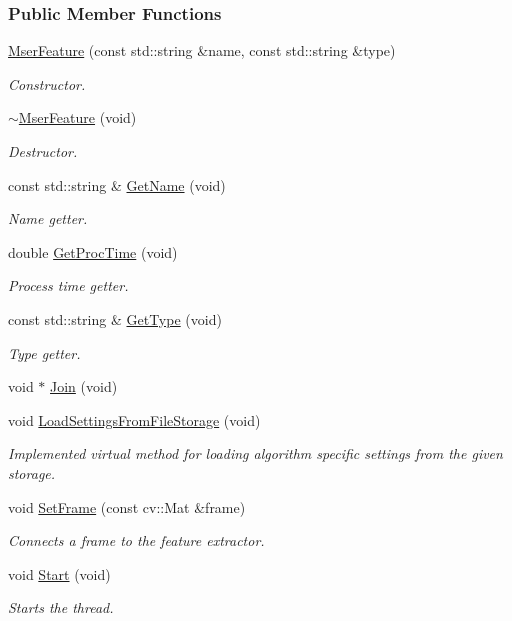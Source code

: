 \subsubsection*{Public Member Functions}
\begin{DoxyCompactItemize}
\item 
\hyperlink{group___feature_extractor_ae82ba666f45d0f4d88be995ae5b6209c}{Mser\-Feature} (const std\-::string \&name, const std\-::string \&type)
\begin{DoxyCompactList}\small\item\em Constructor. \end{DoxyCompactList}\item 
\hyperlink{group___feature_extractor_a4cf98957c8813b3ec26641ded124340d}{$\sim$\-Mser\-Feature} (void)
\begin{DoxyCompactList}\small\item\em Destructor. \end{DoxyCompactList}\item 
const std\-::string \& \hyperlink{group___feature_extractor_a5f69ca2455d5eec4493dbf115d00d5c9}{Get\-Name} (void)
\begin{DoxyCompactList}\small\item\em Name getter. \end{DoxyCompactList}\item 
double \hyperlink{group___feature_extractor_ad07a3104192b50d911eee634a0be009d}{Get\-Proc\-Time} (void)
\begin{DoxyCompactList}\small\item\em Process time getter. \end{DoxyCompactList}\item 
const std\-::string \& \hyperlink{group___feature_extractor_a6724c19006d495bd6a9c8c6029236ebc}{Get\-Type} (void)
\begin{DoxyCompactList}\small\item\em Type getter. \end{DoxyCompactList}\item 
void $\ast$ \hyperlink{group___core_a8f33f7750321d5df9188033e7e3e300d}{Join} (void)
\item 
void \hyperlink{group___feature_extractor_ae6c9bca2395a33ecac78a46e9c331979}{Load\-Settings\-From\-File\-Storage} (void)
\begin{DoxyCompactList}\small\item\em Implemented virtual method for loading algorithm specific settings from the given storage. \end{DoxyCompactList}\item 
void \hyperlink{group___feature_extractor_a3c58d995fb2440b28db3b21b54b94815}{Set\-Frame} (const cv\-::\-Mat \&frame)
\begin{DoxyCompactList}\small\item\em Connects a frame to the feature extractor. \end{DoxyCompactList}\item 
void \hyperlink{group___core_a2b42f82341afd2747ea093b6ac8b91cb}{Start} (void)
\begin{DoxyCompactList}\small\item\em Starts the thread. \end{DoxyCompactList}\end{DoxyCompactItemize}
